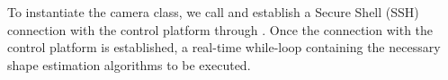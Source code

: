 \par To instantiate the camera class, we call  and establish a Secure Shell (SSH) connection with the control platform through . Once the connection with the control platform is established, a real-time while-loop containing the necessary shape estimation algorithms to be executed. %


    



